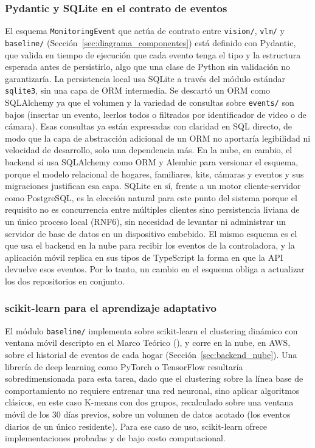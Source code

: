 \subsubsection*{Pydantic y SQLite en el contrato de eventos}
El esquema \texttt{MonitoringEvent} que actúa de contrato entre \texttt{vision/}, \texttt{vlm/} y \texttt{baseline/} (Sección~\ref{sec:diagrama_componentes}) está definido con Pydantic, que valida en tiempo de ejecución que cada evento tenga el tipo y la estructura esperada antes de persistirlo, algo que una clase de Python sin validación no garantizaría.
La persistencia local usa SQLite a través del módulo estándar \texttt{sqlite3}, sin una capa de ORM intermedia.
Se descartó un ORM como SQLAlchemy ya que el volumen y la variedad de consultas sobre \texttt{events/} son bajos (insertar un evento, leerlos todos o filtrados por identificador de video o de cámara).
Esas consultas ya están expresadas con claridad en SQL directo, de modo que la capa de abstracción adicional de un ORM no aportaría legibilidad ni velocidad de desarrollo, solo una dependencia más.
En la nube, en cambio, el backend sí usa SQLAlchemy como ORM y Alembic para versionar el esquema, porque el modelo relacional de hogares, familiares, kits, cámaras y eventos y sus migraciones justifican esa capa.
SQLite en sí, frente a un motor cliente-servidor como PostgreSQL, es la elección natural para este punto del sistema porque el requisito no es concurrencia entre múltiples clientes sino persistencia liviana de un único proceso local (RNF6), sin necesidad de levantar ni administrar un servidor de base de datos en un dispositivo embebido.
El mismo esquema es el que usa el backend en la nube para recibir los eventos de la controladora, y la aplicación móvil replica en sus tipos de TypeScript la forma en que la API devuelve esos eventos.
Por lo tanto, un cambio en el esquema obliga a actualizar los dos repositorios en conjunto.

\subsubsection*{scikit-learn para el aprendizaje adaptativo}
El módulo \texttt{baseline/} implementa sobre scikit-learn el clustering dinámico con ventana móvil descripto en el Marco Teórico (\textcite{Snoun2024}), y corre en la nube, en AWS, sobre el historial de eventos de cada hogar (Sección~\ref{sec:backend_nube}).
Una librería de deep learning como PyTorch o TensorFlow resultaría sobredimensionada para esta tarea, dado que el clustering sobre la línea base de comportamiento no requiere entrenar una red neuronal, sino aplicar algoritmos clásicos, en este caso K-means con dos grupos, recalculado sobre una ventana móvil de los 30 días previos, sobre un volumen de datos acotado (los eventos diarios de un único residente).
Para ese caso de uso, scikit-learn ofrece implementaciones probadas y de bajo costo computacional.

